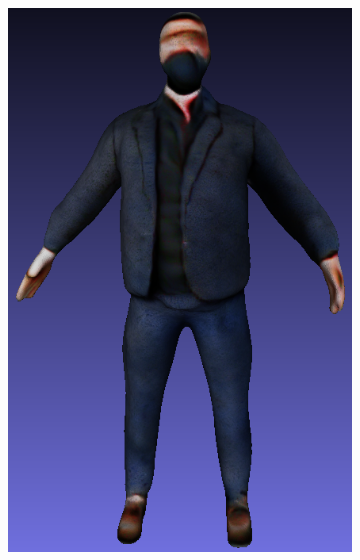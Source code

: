 \begin{figure}[ht]
\begin{subfigure}[b]{0.175\textwidth}
        \includegraphics[width=\textwidth]{etc/bias/bias_poor_genie_4.png}
        \caption{}
    \end{subfigure}


\end{figure}
